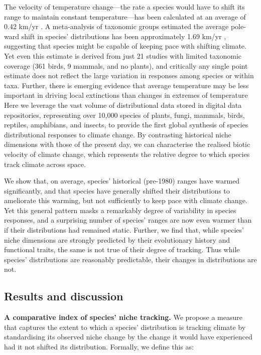 \documentclass[12pt]{report}
\begin{document}
The velocity of temperature change---the rate a species would have to
shift its range to maintain constant temperature---has been calculated
at an average of 0.42 km/yr \supercite{Loarie2009}. A meta-analysis of
taxonomic groups estimated the average pole-ward shift in species'
distributions has been approximately 1.69 km/yr \supercite{Chen2011},
suggesting that species might be capable of keeping pace with shifting
climate. Yet even this estimate is derived from just 21 studies with
limited taxonomic coverage (361 birds, 9 mammals, and no plants), and
critically any single point estimate does not reflect the large
variation in responses among species or within taxa. Further, there is
emerging evidence that average temperature may be less important in
driving local extinctions than changes in extremes of temperature
\supercite{Roman-Palacios2020} Here we leverage the vast volume of
distributional data stored in digital data
repositories\supercite{url_gbif}, representing over 10,000 species of
plants, fungi, mammals, birds, reptiles, amphibians, and insects, to
provide the first global synthesis of species distributional responses
to climate change. By contrasting historical niche dimensions with
those of the present day, we can characterise the realised biotic
velocity of climate change, which represents the relative degree to
which species track climate across space.

We show that, on average, species' historical (pre-1980) ranges have
warmed significantly, and that species have generally shifted their
distributions to ameliorate this warming, but not sufficiently to keep
pace with climate change. Yet this general pattern masks a remarkably
degree of variability in species responses, and a surprising number of
species' ranges are now even warmer than if their distributions had
remained static. Further, we find that, while species' niche
dimensions are strongly predicted by their evolutionary history and
functional traits, the same is not true of their degree of
tracking. Thus while species' distributions are reasonably
predictable, their changes in distributions are not.

\clearpage
\subsection*{Results and discussion}
\textbf{A comparative index of species' niche tracking.} We propose a
measure that captures the extent to which a species' distribution is
tracking climate by standardising its observed niche change by the
change it would have experienced had it not shifted its
distribution. Formally, we define this as:
\end{document}

